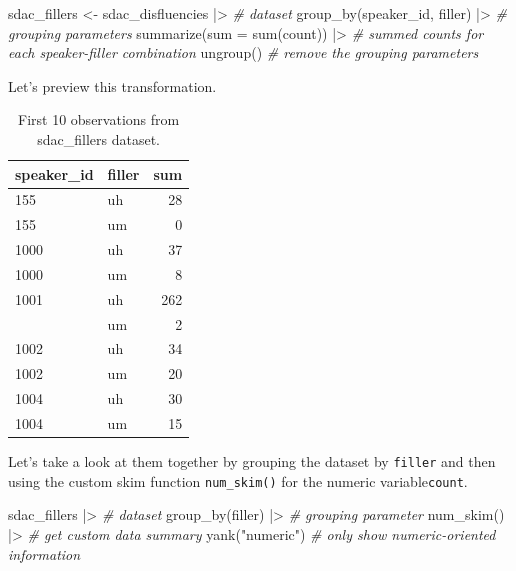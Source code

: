\documentclass[
  letterpaper,
]{scrbook}
\newenvironment{Shaded}{\begin{snugshade}}{\end{snugshade}}
\newcommand{\AttributeTok}[1]{\textcolor[rgb]{0.00,0.00,0.00}{#1}}
\newcommand{\CommentTok}[1]{\textcolor[rgb]{0.00,0.00,0.00}{\textit{#1}}}
\newcommand{\FunctionTok}[1]{\textcolor[rgb]{0.00,0.00,0.00}{#1}}
\newcommand{\NormalTok}[1]{\textcolor[rgb]{0.00,0.00,0.00}{#1}}
\newcommand{\OtherTok}[1]{\textcolor[rgb]{0.00,0.00,0.00}{#1}}
\newcommand{\SpecialCharTok}[1]{\textcolor[rgb]{0.00,0.00,0.00}{#1}}
\newcommand{\StringTok}[1]{\textcolor[rgb]{0.00,0.00,0.00}{#1}}
\begin{document}
\begin{Shaded}
\begin{Highlighting}[]
\NormalTok{sdac\_fillers }\OtherTok{\textless{}{-}} 
\NormalTok{  sdac\_disfluencies }\SpecialCharTok{|\textgreater{}} \CommentTok{\# dataset}
  \FunctionTok{group\_by}\NormalTok{(speaker\_id, filler) }\SpecialCharTok{|\textgreater{}} \CommentTok{\# grouping parameters}
  \FunctionTok{summarize}\NormalTok{(}\AttributeTok{sum =} \FunctionTok{sum}\NormalTok{(count)) }\SpecialCharTok{|\textgreater{}} \CommentTok{\# summed counts for each speaker{-}filler combination}
  \FunctionTok{ungroup}\NormalTok{() }\CommentTok{\# remove the grouping parameters}
\end{Highlighting}
\end{Shaded}

Let's preview this transformation.

\hypertarget{tbl-i-bi-cont-sdac-fillers-preview}{}
\begin{table}
\caption{\label{tbl-i-bi-cont-sdac-fillers-preview}First 10 observations from sdac\_fillers dataset. }\tabularnewline

\centering
\begin{tabular}{llr}
\toprule
speaker\_id & filler & sum\\
\midrule
155 & uh & 28\\
155 & um & 0\\
1000 & uh & 37\\
1000 & um & 8\\
1001 & uh & 262\\
\addlinespace
1001 & um & 2\\
1002 & uh & 34\\
1002 & um & 20\\
1004 & uh & 30\\
1004 & um & 15\\
\bottomrule
\end{tabular}
\end{table}

Let's take a look at them together by grouping the dataset by
\texttt{filler} and then using the custom skim function
\texttt{num\_skim()} for the numeric variable\texttt{count}.

\begin{Shaded}
\begin{Highlighting}[]
\NormalTok{sdac\_fillers }\SpecialCharTok{|\textgreater{}} \CommentTok{\# dataset}
  \FunctionTok{group\_by}\NormalTok{(filler) }\SpecialCharTok{|\textgreater{}} \CommentTok{\# grouping parameter}
  \FunctionTok{num\_skim}\NormalTok{() }\SpecialCharTok{|\textgreater{}} \CommentTok{\# get custom data summary}
  \FunctionTok{yank}\NormalTok{(}\StringTok{"numeric"}\NormalTok{) }\CommentTok{\# only show numeric{-}oriented information}
\end{Highlighting}
\end{Shaded}
\end{document}
